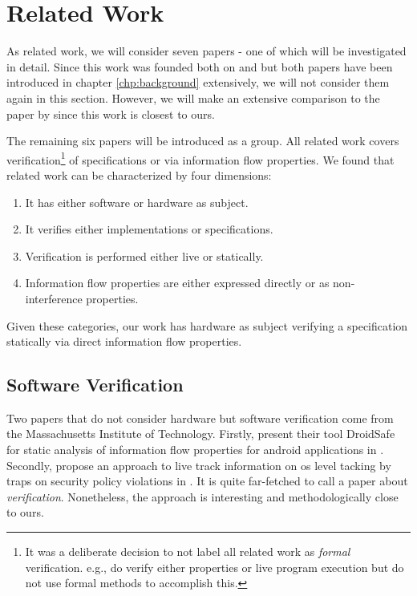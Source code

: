 
\chapter{Related Work}
\label{chp:related-work}

As related work, we will consider seven papers - one of which will be investigated in detail.
Since this work was founded both on  \cite{Reid17} and  \cite{Ferraiuolo17} but both papers have been introduced in chapter \ref{chp:background} extensively, we will not consider them again in this section.
However, we will make an extensive comparison to the paper  \cite{BradfieldS16} by \citeauthor{BradfieldS16} since this work is closest to ours.

The remaining six papers will be introduced as a group.
All related work covers verification\footnote{%
    It was a deliberate decision to not label all related work as \textit{formal} verification.
    e.g., \cite{Zhang15,SuhLZD04} do verify either properties or live program execution but do not use formal methods to accomplish this.
} of specifications or via information flow properties.
We found that related work can be characterized by four dimensions:
\begin{enumerate}
    \item It has either software or hardware as subject.
    \item It verifies either implementations or specifications.
    \item Verification is performed either live or statically.
    \item Information flow properties are either expressed directly or as non-interference properties.
\end{enumerate}

Given these categories, our work has hardware as subject verifying a specification statically via direct information flow properties.

\section{Software Verification}

Two papers that do not consider hardware but software verification come from the Massachusetts Institute of Technology.
Firstly, \citeauthor{GordonKPGNR15} present their tool DroidSafe for static analysis of information flow properties for android applications in  \cite{GordonKPGNR15}.
Secondly, \citeauthor{SuhLZD04} propose an approach to live track information on \gls{os} level tacking by traps on security policy violations in  \cite{SuhLZD04}.
It is quite far-fetched to call \cite{SuhLZD04} a paper about \textit{verification}.
Nonetheless, the approach is interesting and methodologically close to ours.

